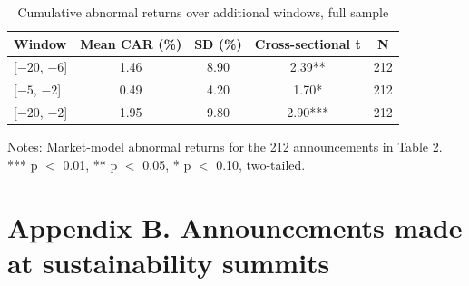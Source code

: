 \documentclass[11pt]{article}
\begin{document}
\begin{table}[h!]
\centering
\begin{threeparttable}
\renewcommand{\thetable}{A3}
\caption{Cumulative abnormal returns over additional windows, full sample}
\small
\begin{tabular}{lcccc}
\toprule
Window & Mean CAR (\%) & SD (\%) & Cross-sectional t & N \\
\midrule
{[}$-20$, $-6${]} & 1.46 & 8.90 & 2.39** & 212 \\
{[}$-5$, $-2${]} & 0.49 & 4.20 & 1.70* & 212 \\
{[}$-20$, $-2${]} & 1.95 & 9.80 & 2.90*** & 212 \\
\bottomrule
\end{tabular}
\begin{tablenotes}\footnotesize
\item Notes: Market-model abnormal returns for the 212 announcements in Table 2. *** p $<$ 0.01, ** p $<$ 0.05, * p $<$ 0.10, two-tailed.
\end{tablenotes}
\end{threeparttable}
\end{table}

\clearpage
\section*{Appendix B. Announcements made at sustainability summits}
\end{document}

